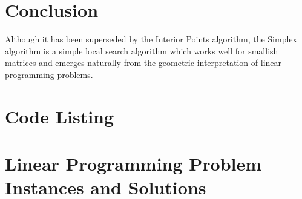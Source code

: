 \documentclass[11pt, a4paper]{article}
\begin{document}
\section{Conclusion}

Although it has been superseded by the Interior Points algorithm, the Simplex algorithm is a simple
local search algorithm which works well for smallish matrices and emerges naturally from the
geometric interpretation of linear programming problems.


\newpage
\section{Code Listing}


\newpage
\section{Linear Programming Problem Instances and Solutions}

\tiny

\end{document}
